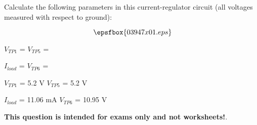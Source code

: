 

Calculate the following parameters in this current-regulator circuit (all voltages measured with respect to ground):

$$\epsfbox{03947x01.eps}$$

$V_{TP1}$ = \hskip 80pt $V_{TP5}$ =

\vskip 10pt

$I_{load}$ = \hskip 80pt $V_{TP6}$ =







$V_{TP1}$ = 5.2 V \hskip 80pt $V_{TP5}$ = 5.2 V

\vskip 10pt

$I_{load}$ = 11.06 mA \hskip 80pt $V_{TP6}$ = 10.95 V







{\bf This question is intended for exams only and not worksheets!}.



